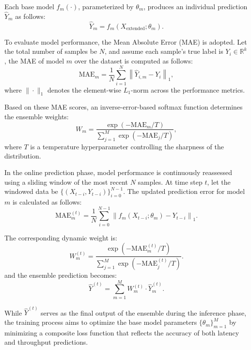 \documentclass[a4paper,fleqn]{cas-dc}
\begin{document}
Each base model \(f_m(\cdot)\), parameterized by \(\theta_m\), produces an individual prediction \(\hat{Y}_m\) as follows:
\begin{equation}
	\hat{Y}_m = f_m(X_{\text{extended}}; \theta_m).
\end{equation}

To evaluate model performance, the Mean Absolute Error (MAE) is adopted. Let the total number of samples be \(N\), and assume each sample’s true label is \(Y_i \in \mathbb{R}^k\), the MAE of model \(m\) over the dataset is computed as follows:
\begin{equation}
	\text{MAE}_m = \frac{1}{N} \sum_{i=1}^{N} \left\| \hat{Y}_{i,m} - Y_i \right\|_1,
\end{equation}
where \(\|\cdot\|_1\) denotes the element-wise \(L_1\)-norm across the performance metrics.

Based on these MAE scores, an inverse-error-based softmax function determines the ensemble weights:
\begin{equation}
	W_m = \frac{\exp(-\text{MAE}_m / T)}{\sum_{j=1}^{M} \exp(-\text{MAE}_j / T)},
\end{equation}
where \(T\) is a temperature hyperparameter controlling the sharpness of the distribution.

In the online prediction phase, model performance is continuously reassessed using a sliding window of the most recent \(N\) samples. At time step \(t\), let the windowed data be \(\{(X_{t-i}, Y_{t-i})\}_{i=0}^{N-1}\). The updated prediction error for model \(m\) is calculated as follows:
\begin{equation}
	\text{MAE}_m^{(t)} = \frac{1}{N} \sum_{i=0}^{N-1} \left\| f_m(X_{t-i}; \theta_m) - Y_{t-i} \right\|_1.
\end{equation}

The corresponding dynamic weight is:
\begin{equation}
	W_m^{(t)} = \frac{\exp(-\text{MAE}_m^{(t)} / T)}{\sum_{j=1}^{M} \exp(-\text{MAE}_j^{(t)} / T)}.
\end{equation}
and the ensemble prediction becomes:
\begin{equation}
	\hat{Y}^{(t)} = \sum_{m=1}^{M} W_m^{(t)} \cdot \hat{Y}_m^{(t)}.
\end{equation}

While \(\hat{Y}^{(t)}\) serves as the final output of the ensemble during the inference phase, the training process aims to optimize the base model parameters \(\{\theta_m\}_{m=1}^{M}\) by minimizing a composite loss function that  reflects the accuracy of both latency and throughput predictions.
\end{document}
